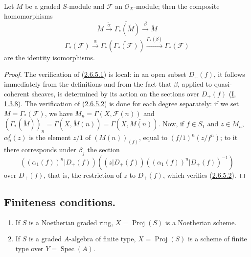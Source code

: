 \begin{proposition}[2.6.5]
\label{II.2.6.5}
Let $M$ be a graded $S$-module and $\mathcal{F}$ an $\mathcal{O}_X$-module;
then the composite homomorphisms
\[
\label{II.2.6.5.1}
  \widetilde{M}\xrightarrow{\widetilde{\alpha}}
  \widetilde{\Gamma_*(\widetilde{M})}
  \xrightarrow{\beta}\widetilde{M}
\tag{2.6.5.1}
\]
\[
\label{II.2.6.5.2}
  \Gamma_*(\mathcal{F})\xrightarrow{\alpha}
  \Gamma_*(\widetilde{\Gamma_*(\mathcal{F})})
  \xrightarrow{\Gamma_*(\beta)}\Gamma_*(\mathcal{F})
\tag{2.6.5.2}
\]
are the identity isomorphisms.
\end{proposition}

\begin{proof}
The verification of (\hyperref[II.2.6.5.1]{2.6.5.1}) is local: in an
open subset $D_+(f)$, it follows immediately from the definitions and from
the fact that $\beta$, applied to quasi-coherent sheaves, is determined by
its action on the sections over $D_+(f)$ (\hyperref[I.1.3.8]{I, 1.3.8}).
The verification of (\hyperref[II.2.6.5.2]{2.6.5.2}) is done for each
degree separately: if we set $M=\Gamma_*(\mathcal{F})$, we have
$M_n=\Gamma(X,\mathcal{F}(n))$ and
$(\Gamma_*(\widetilde{M}))_n=\Gamma(X,\widetilde{M}(n))
=\Gamma(X,\widetilde{M(n)})$. Now, if $f\in S_1$ and $z\in M_n$,
$\alpha_n^f(z)$ is the element $z/1$ of $(M(n))_{(f)}$, equal to
$(f/1)^n(z/f^n)$; to it there corresponds under $\beta_f$ the section
\[
  ((\alpha_1(f))^n|D_+(f))
  ((z|D_+(f))((\alpha_1(f))^n|D_+(f))^{-1})
\]
over $D_+(f)$, that is, the restriction of $z$ to $D_+(f)$, which
verifies (\hyperref[II.2.6.5.2]{2.6.5.2}).
\end{proof}


\subsection{Finiteness conditions.}
\label{subsection:II.2.7}

\begin{proposition}[2.7.1]
\label{II.2.7.1}
\begin{enumerate}
  \item[\rm(i)] If $S$ is a Noetherian graded ring,
    $X=\operatorname{Proj}(S)$ is a Noetherian scheme.
  \item[\rm(ii)] If $S$ is a graded $A$-algebra of finite type,
    $X=\operatorname{Proj}(S)$ is a scheme of finite type over
    $Y=\operatorname{Spec}(A)$.
\end{enumerate}
\end{proposition}

